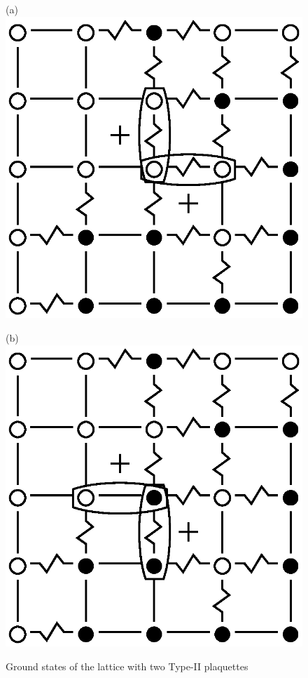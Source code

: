 \documentclass[preprint,12pt]{elsarticle}
\begin{document}
\begin{figure}[H]
	\centering
	\begin{minipage}[h]{0.25\linewidth}
		\centering(a)
		\includegraphics[width=1\linewidth]{pictures/Cl5x5_Type2_gs1.eps}
	\end{minipage}
	\hspace{15pt}
	\begin{minipage}[h]{0.25\linewidth}
		\centering(b)
		\includegraphics[width=1\linewidth]{pictures/Cl5x5_Type2_gs2.eps}
	\end{minipage}
	\caption{Ground states of the lattice with two Type-II plaquettes}
	\label{fig:5x5.22F}
\end{figure}
\end{document}
